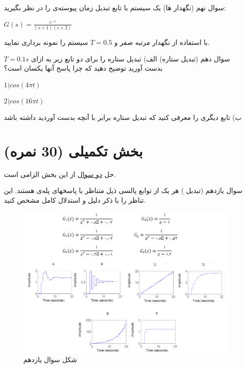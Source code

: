 \documentclass{article}
\begin{document}
\begin{problem}{سوال نهم}
	(نگهدار ها) یک سیستم با تابع تبدیل زمان پیوسته‌ی
	را در نظر بگیرید:
	
	\centering
	$G(s) = \frac{e^{-s}}{(s+1)(s+2)}$
	
	\raggedright
	با استفاده از نگهدار مرتبه صفر و 
	$T = 0.5$
	سیستم را نمونه برداری نمایید.
\end{problem}


\begin{problem}{سوال دهم}
	(تبدیل ستاره) الف) تبدیل ستاره را برای دو تابع زیر به ازای 
	$T = 0.1 s$
	بدست آورید توضیح دهید که چرا پاسخ آنها یکسان است؟
	
	\raggedleft
	$1) cos(4 \pi t)$
	
	$2) cos(16 \pi t)$
	
	\raggedright
	ب) تابع دیگری را معرفی کنید که تبدیل ستاره برابر با آنچه بدست آوردید داشته باشد
	
\end{problem}


\raggedleft
\section{ بخش تکمیلی (30 نمره)}
\centering
حل \underline{دو سوال} از این بخش الزامی است.
\begin{problem}{سوال یازدهم}
	(تبدیل ) هر یک از توابع پالسی ذیل متناظر با پاسخهای پله‌ی
	 هستند. این تناظر را با ذکر دلیل و استدلال کامل مشخص کنید.
\end{problem}
\begin{figure}[htbp]
	\includegraphics[width=\linewidth]{Second Series/1.png}
	\caption{شکل سوال یازدهم}
\end{figure}
\end{document}

